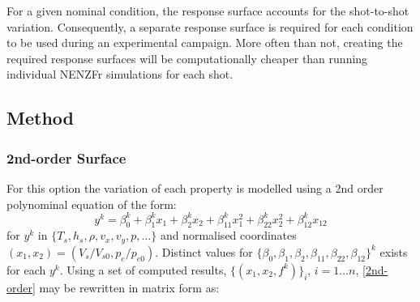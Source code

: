 For a given nominal condition, the response surface accounts for the shot-to-shot variation. Consequently, a separate response surface is required for each condition to be used during an experimental campaign. More often than not, creating the required response surfaces will be computationally cheaper than running individual NENZFr simulations for each shot.


\subsection{Method} \label{RS-methods}
\subsubsection{2nd-order Surface}
For this option the variation of each property is modelled using a 2nd order polynominal equation of the form:
\begin{equation}
y^k = \beta_0^k + \beta_1^k x_1 + \beta_2^k x_2 + \beta_{11}^k x_1^2 + \beta_{22}^k x_2^2 + \beta_{12}^k x_{12}
\label{2nd-order}
\end{equation}
for $y^k$ in $\lbrace T_s, h_s, \rho, v_x, v_y, p, \dots \rbrace$ and normalised coordinates $(x_1, x_2) = (V_s/V_{s0}, p_e/p_{e0})$. Distinct values for $\lbrace \beta_0, \beta_1, \beta_2, \beta_{11}, \beta_{22}, \beta_{12}\rbrace^k$ exists for each $y^k$. Using a set of computed results, $\lbrace (x_1, x_2, f^k) \rbrace_i$, $i = 1 \dots n$, \cref{2nd-order} may be rewritten in matrix form as:
